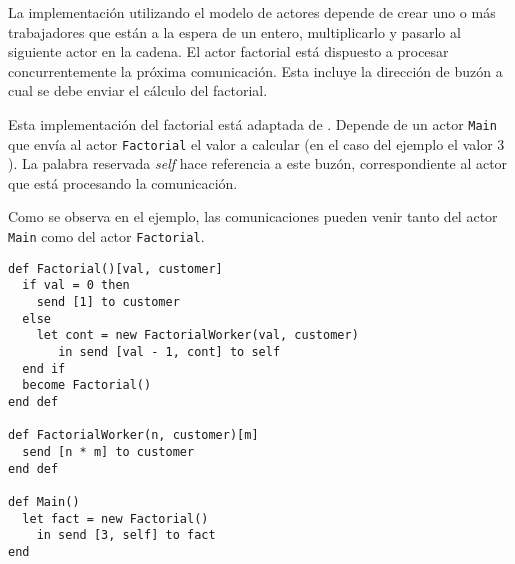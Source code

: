 La implementación utilizando el modelo de actores depende de crear uno o más trabajadores que están a la espera de un entero, multiplicarlo y pasarlo al siguiente actor en la cadena. El actor factorial está dispuesto a procesar concurrentemente la próxima comunicación. Esta incluye la dirección de buzón a cual se debe enviar el cálculo del factorial.

Esta implementación del factorial está adaptada de \cite{Agha:1986:AMC:7929}. Depende de un actor \lstinline[language=sal, style=simple]$Main$ que envía al actor \lstinline[language=sal, style=simple]$Factorial$ el valor a calcular (en el caso del ejemplo el valor $3$). La palabra reservada \textit{self} hace referencia a este buzón, correspondiente al actor que está procesando la comunicación.

Como se observa en el ejemplo, las comunicaciones pueden venir tanto del actor \lstinline[language=sal, style=simple]$Main$ como del actor \lstinline[language=sal, style=simple]$Factorial$.

\begin{lstlisting}[language=sal, style=simple]
def Factorial()[val, customer]
  if val = 0 then
    send [1] to customer
  else
    let cont = new FactorialWorker(val, customer)
       in send [val - 1, cont] to self
  end if 
  become Factorial()
end def

def FactorialWorker(n, customer)[m] 
  send [n * m] to customer
end def

def Main() 
  let fact = new Factorial() 
    in send [3, self] to fact
end
\end{lstlisting}

